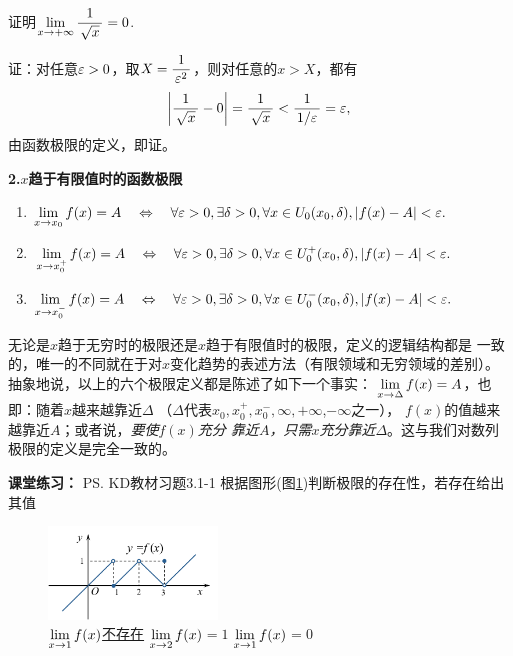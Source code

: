 \bs

\egz 证明$\lim\limits_{x\to{+\infty}}\displaystyle\frac{\,{1}\,}{\,{\sqrt x}\,}=0$.

证：对任意$\varepsilon>0$，取$X=\displaystyle\frac{\,{1}\,}{\,{\varepsilon^2}\,}$，则对任意的$x>X$，都有
$$\left|\displaystyle\frac{\,{1}\,}{\,{\sqrt x}\,}-0\right|=\displaystyle\frac{\,{1}\,}{\,{\sqrt x}\,}<\displaystyle\frac{\,{1}\,}{\,{1/\varepsilon}\,}=\varepsilon,$$
由函数极限的定义，即证。\fin

\bs

{\bf 2.\;$x$趋于有限值时的函数极限}

\begin{thx}
	\begin{enumerate}%
	  \item $\lim\limits_{x\to{x_0}}f(x)=A\quad\Leftrightarrow\quad
	  \forall \varepsilon>0,\exists\delta>0,\forall
	  x\in U_0(x_0,\delta),|f(x)-A|<\varepsilon.$
	  \item $\lim\limits_{x\to{x_0^+}}f(x)=A\quad\Leftrightarrow\quad
	  \forall \varepsilon>0,\exists\delta>0,\forall x\in
	  U_0^+(x_0,\delta),|f(x)-A|<\varepsilon.$
	  \item $\lim\limits_{x\to{x_0^-}}f(x)=A\quad\Leftrightarrow\quad
	  \forall \varepsilon>0,\exists\delta>0,\forall
	  x\in U_0^-(x_0,\delta),|f(x)-A|<\varepsilon.$
	\end{enumerate}
\end{thx}

无论是$x$趋于无穷时的极限还是$x$趋于有限值时的极限，定义的逻辑结构都是
一致的，唯一的不同就在于对$x$变化趋势的表述方法（有限领域和无穷领域的差别）。
抽象地说，以上的六个极限定义都是陈述了如下一个事实：{\kaishu 
$\lim\limits_{x\to{\Delta}}f(x)=A$，也即：随着$x$越来越靠近$\Delta$
（$\Delta$代表$x_0,x_0^+,x_0^-,\infty,+\infty$,$-\infty$之一），
$f(x)$的值越来越靠近$A$}；或者说，{\it 要使$f(x)$充分
靠近$A$，只需$x$充分靠近$\Delta$}。这与我们对数列极限的定义是完全一致的。

\bs

{\bf 课堂练习：} \ps{KD教材习题3.1-1}
根据图形(图\ref{fig:limxexist})判断极限的存在性，若存在给出其值
\begin{figure}[h]
	\centering
	\includegraphics[width=0.4\textwidth]{./Images/Ch01/limxf.pdf}
	\caption{$\lim\limits_{x\to{1}}f(x)$\underline{不存在}
	\quad $\lim\limits_{x\to{2}}f(x)$\underline{$=1$}
	\quad $\lim\limits_{x\to{1}}f(x)$\underline{$=0$}}
	\label{fig:limxexist}
\end{figure}

